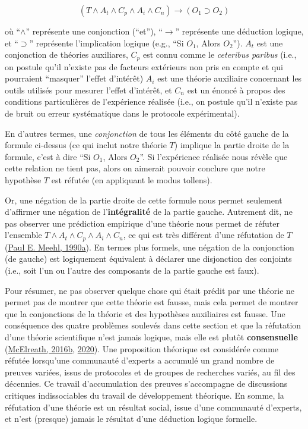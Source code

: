 \documentclass[
  a4paper,11pt,twoside,onecolumn,openright,final,oldfontcommands]{memoir}
\theoremstyle{definition}
\theoremstyle{definition}
\theoremstyle{definition}
\theoremstyle{definition}
\theoremstyle{remark}
\begin{document}
\[(T \land A_{t} \land C_{p} \land A_{i} \land C_{n}) \to (O_{1} \supset O_{2})\]

où ``\(\land\)'' représente une conjonction (``et''), ``\(\to\)'' représente une déduction logique, et ``\(\supset\)'' représente l'implication logique (e.g., ``Si \(O_{1}\), Alors \(O_{2}\)''). \(A_{t}\) est une conjonction de théories auxiliares, \(C_{p}\) est connu comme le \emph{ceteribus paribus} (i.e., on postule qu'il n'existe pas de facteurs extérieurs non pris en compte et qui pourraient ``masquer'' l'effet d'intérêt) \(A_{i}\) est une théorie auxiliaire concernant les outils utilisés pour mesurer l'effet d'intérêt, et \(C_{n}\) est un énoncé à propos des conditions particulières de l'expérience réalisée (i.e., on postule qu'il n'existe pas de bruit ou erreur systématique dans le protocole expérimental).

En d'autres termes, une \emph{conjonction} de tous les éléments du côté gauche de la formule ci-dessus (ce qui inclut notre théorie \(T\)) implique la partie droite de la formule, c'est à dire ``Si \(O_{1}\), Alors \(O_{2}\)''. Si l'expérience réalisée nous révèle que cette relation ne tient pas, alors on aimerait pouvoir conclure que notre hypothèse \(T\) est réfutée (en appliquant le modus tollens).

Or, une négation de la partie droite de cette formule nous permet seulement d'affirmer une négation de l'\textbf{intégralité} de la partie gauche. Autrement dit, ne pas observer une prédiction empirique d'une théorie nous permet de réfuter l'ensemble \(T \land A_{t} \land C_{p} \land A_{i} \land C_{n}\), ce qui est très différent d'une réfutation de \(T\) (\protect\hyperlink{ref-meehl_appraising_1990}{Paul E. Meehl, 1990a}). En termes plus formels, une négation de la conjonction (de gauche) est logiquement équivalent à déclarer une disjonction des conjoints (i.e., soit l'un ou l'autre des composants de la partie gauche est faux).

Pour résumer, ne pas observer quelque chose qui était prédit par une théorie ne permet pas de montrer que cette théorie est fausse, mais cela permet de montrer que la conjonctions de la théorie et des hypothèses auxiliaires est fausse. Une conséquence des quatre problèmes soulevés dans cette section et que la réfutation d'une théorie scientifique n'est jamais logique, mais elle est plutôt \textbf{consensuelle} (\protect\hyperlink{ref-mcelreath_statistical_2016}{McElreath, 2016b}, \protect\hyperlink{ref-mcelreath_statistical_2020}{2020}). Une proposition théorique est considérée comme réfutée lorsqu'une communauté d'experts a accumulé un grand nombre de preuves variées, issus de protocoles et de groupes de recherches variés, au fil des décennies. Ce travail d'accumulation des preuves s'accompagne de discussions critiques indissociables du travail de développement théorique. En somme, la réfutation d'une théorie est un résultat social, issue d'une communauté d'experts, et n'est (presque) jamais le résultat d'une déduction logique formelle.
\end{document}
